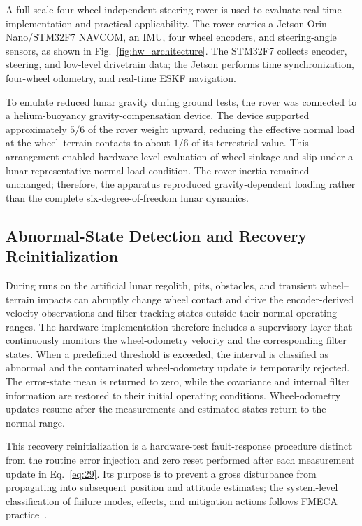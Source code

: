 \documentclass[]{IAC_style}
\begin{document}
A full-scale four-wheel independent-steering rover is used to evaluate real-time implementation and practical applicability. The rover carries a Jetson Orin Nano/STM32F7 NAVCOM, an IMU, four wheel encoders, and steering-angle sensors, as shown in Fig.~\ref{fig:hw_architecture}. The STM32F7 collects encoder, steering, and low-level drivetrain data; the Jetson performs time synchronization, four-wheel odometry, and real-time ESKF navigation.

To emulate reduced lunar gravity during ground tests, the rover was connected to a helium-buoyancy gravity-compensation device. The device supported approximately $5/6$ of the rover weight upward, reducing the effective normal load at the wheel--terrain contacts to about $1/6$ of its terrestrial value. This arrangement enabled hardware-level evaluation of wheel sinkage and slip under a lunar-representative normal-load condition. The rover inertia remained unchanged; therefore, the apparatus reproduced gravity-dependent loading rather than the complete six-degree-of-freedom lunar dynamics.

\subsection{Abnormal-State Detection and Recovery Reinitialization}
\label{sec:recovery_reinitialization}

During runs on the artificial lunar regolith, pits, obstacles, and transient wheel--terrain impacts can abruptly change wheel contact and drive the encoder-derived velocity observations and filter-tracking states outside their normal operating ranges. The hardware implementation therefore includes a supervisory layer that continuously monitors the wheel-odometry velocity and the corresponding filter states. When a predefined threshold is exceeded, the interval is classified as abnormal and the contaminated wheel-odometry update is temporarily rejected. The error-state mean is returned to zero, while the covariance and internal filter information are restored to their initial operating conditions. Wheel-odometry updates resume after the measurements and estimated states return to the normal range.

This recovery reinitialization is a hardware-test fault-response procedure distinct from the routine error injection and zero reset performed after each measurement update in Eq.~\eqref{eq:29}. Its purpose is to prevent a gross disturbance from propagating into subsequent position and attitude estimates; the system-level classification of failure modes, effects, and mitigation actions follows FMECA practice~\cite{borgovini1993fmeca}.
\end{document}

